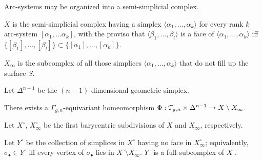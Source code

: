 Arc-systems may be organized into a semi-simplicial complex.
\begin{definition}
  $X$ is the semi-simplicial complex having a simplex $\langle\alpha_1, \ldots, \alpha_k\rangle$
  for every rank $k$ arc-system $[\alpha_1, \ldots \alpha_k]$, with the proviso that
  $\langle\beta_1, \ldots, \beta_l\rangle$ is a face of $\langle\alpha_1, \ldots, \alpha_k\rangle$ iff $\{ [\beta_1], \ldots, [\beta_l]
  \} \subset \{ [\alpha_1], \ldots, [\alpha_k] \}$.
  
  $X_\infty$ is the subcomplex of all those simplices $\langle\alpha_1, \ldots, \alpha_k\rangle$
  that do not fill up the surface $S$.
\end{definition}

Let $\Delta^{n-1}$ be the $(n-1)$-dimensional geometric simplex.
\begin{theorem}
There exists a $\Gamma_{g,n}$-equivariant homeomorphism $\Phi: \mathcal{T}_{g,n} \times
\Delta^{n-1} \to X \setminus X_\infty$.
\end{theorem}

Let $X^\circ$, $X_\infty^\circ$ be the first barycentric subdivisions of $X$
and $X_\infty$, respectively.

\begin{definition}
  Let $Y^\circ$ be the collection of simplices in $X^\circ$ having no face in
  $X_\infty^\circ$; equivalently, $\sigma_\bullet \in Y^\circ$ iff every vertex of $\sigma_\bullet$
  lies in $X^\circ \setminus X_\infty^\circ$.  $Y^\circ$ is a full subcomplex of $X^\circ$.
\end{definition}






